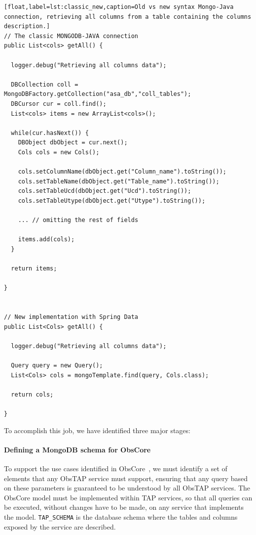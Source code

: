 \begin{lstlisting}[float,label=lst:classic_new,caption=Old vs new syntax Mongo-Java connection, retrieving all columns from a table containing the columns description.]
// The classic MONGODB-JAVA connection
public List<cols> getAll() {
  
  logger.debug("Retrieving all columns data");

  DBCollection coll = MongoDBFactory.getCollection("asa_db","coll_tables");
  DBCursor cur = coll.find();
  List<cols> items = new ArrayList<cols>();

  while(cur.hasNext()) {
    DBObject dbObject = cur.next();
    Cols cols = new Cols();

    cols.setColumnName(dbObject.get("Column_name").toString());
    cols.setTableName(dbObject.get("Table_name").toString());
    cols.setTableUcd(dbObject.get("Ucd").toString());
    cols.setTableUtype(dbObject.get("Utype").toString());
    
    ... // omitting the rest of fields

    items.add(cols);
  }

  return items;

}


// New implementation with Spring Data
public List<Cols> getAll() {

  logger.debug("Retrieving all columns data");

  Query query = new Query();
  List<Cols> cols = mongoTemplate.find(query, Cols.class);

  return cols;

}
\end{lstlisting}

To accomplish this job, we have identified three major stages:

\paragraph*{Defining a MongoDB schema for ObsCore} %
\label{par:mongodb_obscore}

To support the use cases identified in ObsCore~\cite{2011arXiv1111.1758L},
we must identify a set of elements that any ObsTAP service must support, ensuring that any query based on these parameters is guaranteed to be understood by all ObsTAP services.
The ObsCore model must be implemented within TAP services, so that all queries can be executed, without changes have to be made, on any service that implements the model.
\texttt{TAP\_SCHEMA} is the database schema where the tables and columns exposed by the service are described.

